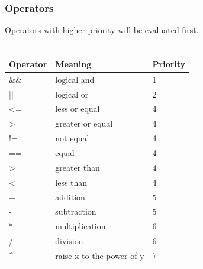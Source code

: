 \subsubsection{Operators}
Operators with higher priority will be evaluated first.
\\ \\
\begin{tabular}{ l l l }
\textbf{Operator} & \textbf{Meaning} & \textbf{Priority} \\ \hline
\&\& & logical and & 1 \\ \hline
|| & logical or & 2 \\ \hline
\textless= & less or equal & 4 \\ \hline
\textgreater= & greater or equal & 4 \\ \hline
!= & not equal & 4 \\ \hline
== & equal & 4 \\ \hline
\textgreater & greater than & 4 \\ \hline
\textless & less than & 4 \\ \hline
+ & addition & 5 \\ \hline
- & subtraction & 5 \\ \hline
* & multiplication & 6 \\ \hline
/ & division & 6 \\ \hline
\textasciicircum & raise x to the power of y & 7 \\ \hline
\end{tabular}

%
%
%
%
%
%



